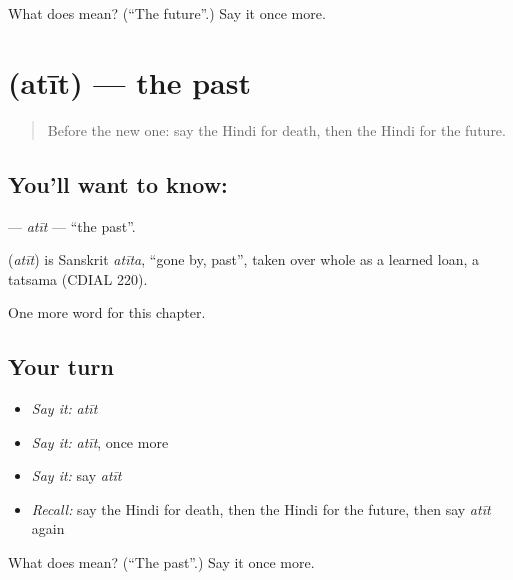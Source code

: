 \begin{tcolorbox}[breakable,colback=teal!4,colframe=teal!35!black,title={Before you move on}]
What does  mean? (\textquotedblleft{}The future\textquotedblright{}.) Say it once more.
\end{tcolorbox}
\section[\texorpdfstring{\hi{अतीत} (atīt)}{अतीत (atīt)}]{ (atīt) — the past}

\label{lesson:HI-C221-atit}



\begin{quote}
Before the new one: say the Hindi for death, then the Hindi for the future.
\end{quote}

\subsection*{You'll want to know: }
\textbf{} — \emph{atīt} — \textquotedblleft{}the past\textquotedblright{}.

\begin{cousinweb}
\textbf{} (\emph{atīt}) is Sanskrit \emph{atīta}, \textquotedblleft{}gone by, past\textquotedblright{}, taken over whole as a learned loan, a tatsama (CDIAL 220).
\end{cousinweb}

\begin{grammarlens}[title={What you've built}]
One more word for this chapter.
\end{grammarlens}

\subsection*{Your turn}
\begin{itemize}
\raggedright
  \item \emph{Say it:} \emph{atīt}
  \item \emph{Say it:} \emph{atīt}, once more
  \item \emph{Say it:} say \emph{atīt}
  \item \emph{Recall:} say the Hindi for death, then the Hindi for the future, then say \emph{atīt} again
\end{itemize}

\begin{tcolorbox}[breakable,colback=teal!4,colframe=teal!35!black,title={Before you move on}]
What does  mean? (\textquotedblleft{}The past\textquotedblright{}.) Say it once more.
\end{tcolorbox}
